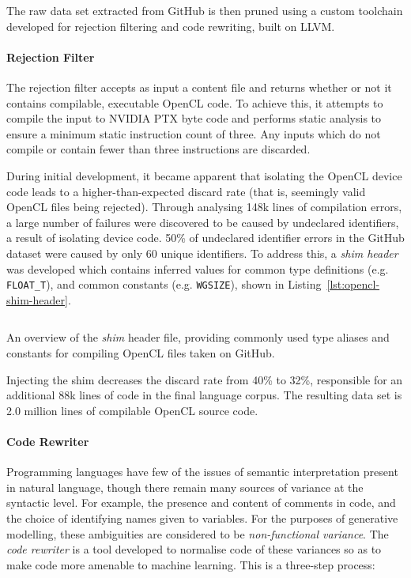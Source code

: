 The raw data set extracted from GitHub is then pruned using a custom toolchain developed for rejection filtering and code rewriting, built on LLVM.


\paragraph*{Rejection Filter}
\label{subsubsec:opencl-rejection-filter}

The rejection filter accepts as input a content file and returns whether or not it contains compilable, executable OpenCL code. To achieve this, it attempts to compile the input to NVIDIA PTX byte code and performs static analysis to ensure a minimum static instruction count of three. Any inputs which do not compile or contain fewer than three instructions are discarded.

During initial development, it became apparent that isolating the OpenCL device code leads to a higher-than-expected discard rate (that is, seemingly valid OpenCL files being rejected). Through analysing 148k lines of compilation errors, a large number of failures were discovered to be caused by undeclared identifiers, a result of isolating device code. 50\% of undeclared identifier errors in the GitHub dataset were caused by only 60 unique identifiers. To address this, a \emph{shim header} was developed which contains inferred values for common type definitions (e.g. \texttt{FLOAT\_T}), and common constants (e.g. \texttt{WGSIZE}), shown in Listing~\ref{lst:opencl-shim-header}.

\begin{listing}
\inputminted{c}{lst/opencl-shim-header.h}
\caption[The \emph{shim} header file for compiling OpenCL from GitHub]{An overview of the \emph{shim} header file, providing commonly used type aliases and constants for compiling OpenCL files taken on GitHub.}
\label{lst:opencl-shim-header}
\end{listing}

Injecting the shim decreases the discard rate from 40\% to 32\%, responsible for an additional 88k lines of code in the final language corpus. The resulting data set is 2.0 million lines of compilable OpenCL source code.

\paragraph*{Code Rewriter}
\label{subsubsec:clgen-rewriter}

Programming languages have few of the issues of semantic interpretation present in natural language, though there remain many sources of variance at the syntactic level. For example, the presence and content of comments in code, and the choice of identifying names given to variables. For the purposes of generative modelling, these ambiguities are considered to be \emph{non-functional variance}. The \emph{code rewriter} is a tool developed to normalise code of these variances so as to make code more amenable to machine learning. This is a three-step process:

